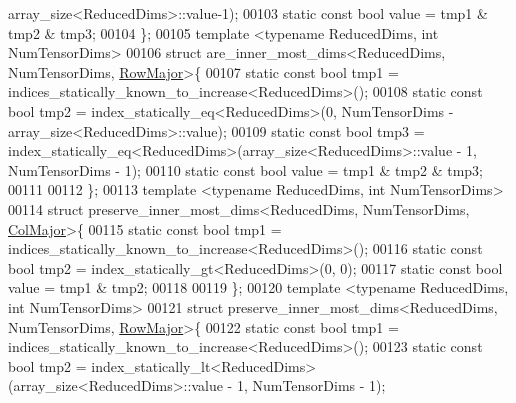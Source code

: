 \begin{DoxyCode}
      array\_size<ReducedDims>::value-1);
00103   \textcolor{keyword}{static} \textcolor{keyword}{const} \textcolor{keywordtype}{bool} value = tmp1 & tmp2 & tmp3;
00104 \};
00105 \textcolor{keyword}{template} <\textcolor{keyword}{typename} ReducedDims, \textcolor{keywordtype}{int} NumTensorDims>
00106 \textcolor{keyword}{struct }are\_inner\_most\_dims<ReducedDims, NumTensorDims, \hyperlink{group__enums_ggaacded1a18ae58b0f554751f6cdf9eb13acfcde9cd8677c5f7caf6bd603666aae3}{RowMajor}>\{
00107   \textcolor{keyword}{static} \textcolor{keyword}{const} \textcolor{keywordtype}{bool} tmp1 = indices\_statically\_known\_to\_increase<ReducedDims>();
00108   \textcolor{keyword}{static} \textcolor{keyword}{const} \textcolor{keywordtype}{bool} tmp2 = index\_statically\_eq<ReducedDims>(0, NumTensorDims - 
      array\_size<ReducedDims>::value);
00109   \textcolor{keyword}{static} \textcolor{keyword}{const} \textcolor{keywordtype}{bool} tmp3 = index\_statically\_eq<ReducedDims>(array\_size<ReducedDims>::value - 1, 
      NumTensorDims - 1);
00110   \textcolor{keyword}{static} \textcolor{keyword}{const} \textcolor{keywordtype}{bool} value = tmp1 & tmp2 & tmp3;
00111 
00112 \};
00113 \textcolor{keyword}{template} <\textcolor{keyword}{typename} ReducedDims, \textcolor{keywordtype}{int} NumTensorDims>
00114 \textcolor{keyword}{struct }preserve\_inner\_most\_dims<ReducedDims, NumTensorDims, \hyperlink{group__enums_ggaacded1a18ae58b0f554751f6cdf9eb13a0cbd4bdd0abcfc0224c5fcb5e4f6669a}{ColMajor}>\{
00115   \textcolor{keyword}{static} \textcolor{keyword}{const} \textcolor{keywordtype}{bool} tmp1 = indices\_statically\_known\_to\_increase<ReducedDims>();
00116   \textcolor{keyword}{static} \textcolor{keyword}{const} \textcolor{keywordtype}{bool} tmp2 = index\_statically\_gt<ReducedDims>(0, 0);
00117   \textcolor{keyword}{static} \textcolor{keyword}{const} \textcolor{keywordtype}{bool} value = tmp1 & tmp2;
00118 
00119 \};
00120 \textcolor{keyword}{template} <\textcolor{keyword}{typename} ReducedDims, \textcolor{keywordtype}{int} NumTensorDims>
00121 \textcolor{keyword}{struct }preserve\_inner\_most\_dims<ReducedDims, NumTensorDims, \hyperlink{group__enums_ggaacded1a18ae58b0f554751f6cdf9eb13acfcde9cd8677c5f7caf6bd603666aae3}{RowMajor}>\{
00122   \textcolor{keyword}{static} \textcolor{keyword}{const} \textcolor{keywordtype}{bool} tmp1 = indices\_statically\_known\_to\_increase<ReducedDims>();
00123   \textcolor{keyword}{static} \textcolor{keyword}{const} \textcolor{keywordtype}{bool} tmp2 = index\_statically\_lt<ReducedDims>(array\_size<ReducedDims>::value - 1, 
      NumTensorDims - 1);

\end{DoxyCode}
